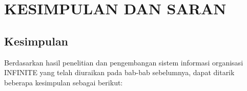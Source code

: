 
\chapter[KESIMPULAN DAN SARAN]{\\ KESIMPULAN DAN SARAN}

\section{Kesimpulan}

Berdasarkan hasil penelitian dan pengembangan sistem informasi organisasi INFINITE yang telah diuraikan pada bab-bab sebelumnya, dapat ditarik beberapa kesimpulan sebagai berikut:

